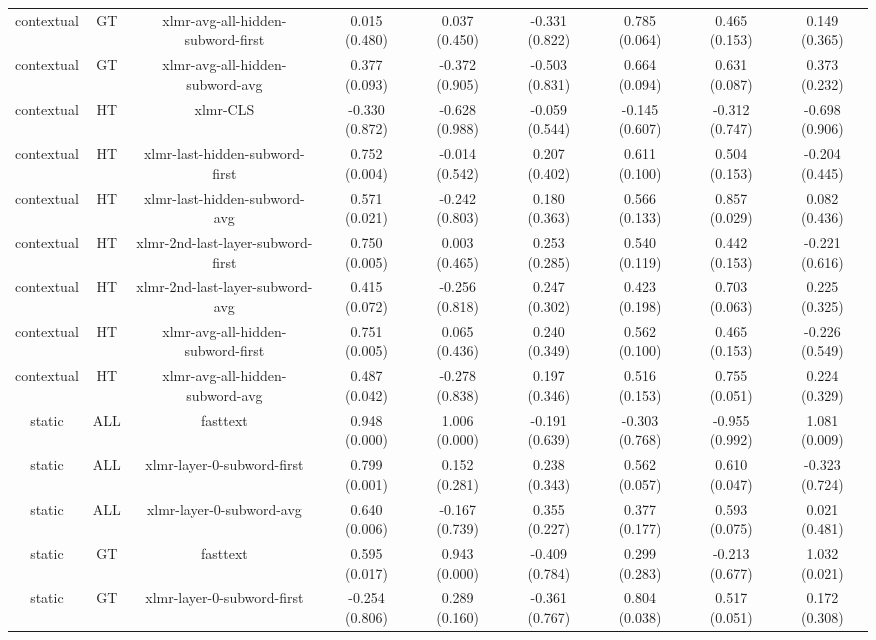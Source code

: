 \begin{sidewaystable}[htb]
\begin{tabular}{@{}ccccccccc@{}}
        contextual & GT & xlmr-avg-all-hidden-subword-first & 0.015 (0.480) & 0.037 (0.450) & -0.331 (0.822) & 0.785 (0.064) & 0.465 (0.153) & 0.149 (0.365) \\
        contextual & GT & xlmr-avg-all-hidden-subword-avg & 0.377 (0.093) & -0.372 (0.905) & -0.503 (0.831) & 0.664 (0.094) & 0.631 (0.087) & 0.373 (0.232) \\
        contextual & HT & xlmr-CLS & -0.330 (0.872) & -0.628 (0.988) & -0.059 (0.544) & -0.145 (0.607) & -0.312 (0.747) & -0.698 (0.906) \\
        contextual & HT & xlmr-last-hidden-subword-first & 0.752 (0.004) & -0.014 (0.542) & 0.207 (0.402) & 0.611 (0.100) & 0.504 (0.153) & -0.204 (0.445) \\
        contextual & HT & xlmr-last-hidden-subword-avg & 0.571 (0.021) & -0.242 (0.803) & 0.180 (0.363) & 0.566 (0.133) & 0.857 (0.029) & 0.082 (0.436) \\
        contextual & HT & xlmr-2nd-last-layer-subword-first & 0.750 (0.005) & 0.003 (0.465) & 0.253 (0.285) & 0.540 (0.119) & 0.442 (0.153) & -0.221 (0.616) \\
        contextual & HT & xlmr-2nd-last-layer-subword-avg & 0.415 (0.072) & -0.256 (0.818) & 0.247 (0.302) & 0.423 (0.198) & 0.703 (0.063) & 0.225 (0.325) \\
        contextual & HT & xlmr-avg-all-hidden-subword-first & 0.751 (0.005) & 0.065 (0.436) & 0.240 (0.349) & 0.562 (0.100) & 0.465 (0.153) & -0.226 (0.549) \\
        contextual & HT & xlmr-avg-all-hidden-subword-avg & 0.487 (0.042) & -0.278 (0.838) & 0.197 (0.346) & 0.516 (0.153) & 0.755 (0.051) & 0.224 (0.329) \\
        static & ALL & fasttext & 0.948 (0.000) & 1.006 (0.000) & -0.191 (0.639) & -0.303 (0.768) & -0.955 (0.992) & 1.081 (0.009) \\
        static & ALL & xlmr-layer-0-subword-first & 0.799 (0.001) & 0.152 (0.281) & 0.238 (0.343) & 0.562 (0.057) & 0.610 (0.047) & -0.323 (0.724) \\
        static & ALL & xlmr-layer-0-subword-avg & 0.640 (0.006) & -0.167 (0.739) & 0.355 (0.227) & 0.377 (0.177) & 0.593 (0.075) & 0.021 (0.481) \\
        static & GT & fasttext & 0.595 (0.017) & 0.943 (0.000) & -0.409 (0.784) & 0.299 (0.283) & -0.213 (0.677) & 1.032 (0.021) \\
        static & GT & xlmr-layer-0-subword-first & -0.254 (0.806) & 0.289 (0.160) & -0.361 (0.767) & 0.804 (0.038) & 0.517 (0.051) & 0.172 (0.308) \\

\end{tabular}
\end{sidewaystable}
